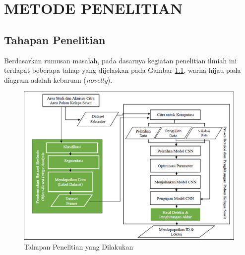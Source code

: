 \chapter{METODE PENELITIAN}

\vspace{1cm}
\section{Tahapan Penelitian}
\hspace{1,2cm}Berdasarkan rumusan masalah, pada dasarnya kegiatan penelitian ilmiah ini terdapat beberapa tahap yang dijelaskan pada Gambar \ref{img:Tahapan-Penelitian}, warna hijau pada diagram adalah kebaruan (\textit{novelty}).

\begin{figure}[H]
	\vspace{-0.1cm}
	\begin{center}
		\includegraphics[width=1\columnwidth]{bab3/Gambar/Picture1.png}
	\end{center}
	\vspace{-0.2cm}
	\captionsetup{justification=centering}
	\caption{Tahapan Penelitian yang Dilakukan}\label{img:Tahapan-Penelitian}
\end{figure}

